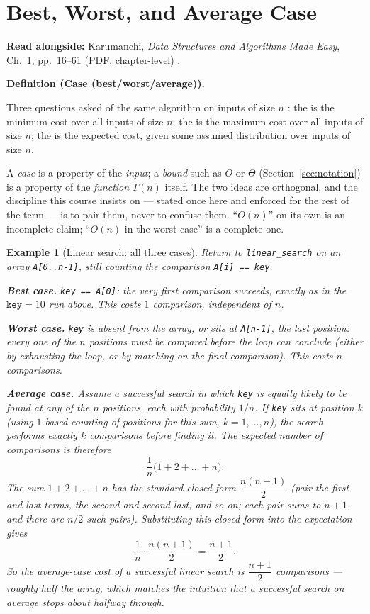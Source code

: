 \documentclass[11pt]{article}
\newtheorem{example}{Example}[section]
\newenvironment{definitionbox}[1]{%
  \par\noindent\textbf{Definition (#1).}\ \itshape
}{\par\vspace{0.3em}}
\begin{document}
\section{Best, Worst, and Average Case}
\label{sec:cases}

\textbf{Read alongside:} Karumanchi, \textit{Data Structures and Algorithms Made Easy}, Ch.~1, pp.~16--61 (PDF, chapter-level) \cite{Karumanchi2017_data_structures_algorithms_made_easy}.

\begin{definitionbox}{Case (best/worst/average)}
Three questions asked of the same algorithm on inputs of size $n$
\cite{Karumanchi2017_data_structures_algorithms_made_easy}: the
 is the minimum cost over all inputs of size $n$; the
 is the maximum cost over all inputs of size $n$; the
 is the expected cost, given some assumed distribution
over inputs of size $n$.
\end{definitionbox}

A \emph{case} is a property of the \emph{input}; a \emph{bound} such as $O$
or $\Theta$ (Section~\ref{sec:notation}) is a property of the \emph{function}
$T(n)$ itself. The two ideas are orthogonal, and the discipline this course
insists on --- stated once here and enforced for the rest of the term --- is
to pair them, never to confuse them. ``$O(n)$'' on its own is an incomplete
claim; ``$O(n)$ in the worst case'' is a complete one.

\begin{example}[Linear search: all three cases]
Return to \texttt{linear\_search} on an array \texttt{A[0..n-1]}, still
counting the comparison \texttt{A[i] == key}.

\textbf{Best case.} \texttt{key == A[0]}: the very first comparison
succeeds, exactly as in the $\texttt{key} = 10$ run above. This costs $1$
comparison, independent of $n$.

\textbf{Worst case.} \texttt{key} is absent from the array, or sits at
\texttt{A[n-1]}, the last position: every one of the $n$ positions must be
compared before the loop can conclude (either by exhausting the loop, or by
matching on the final comparison). This costs $n$ comparisons.

\textbf{Average case.} Assume a \emph{successful} search in which
\texttt{key} is equally likely to be found at any of the $n$ positions,
each with probability $1/n$. If \texttt{key} sits at position $k$ (using
$1$-based counting of positions for this sum, $k = 1, \dots, n$), the search
performs exactly $k$ comparisons before finding it. The expected number of
comparisons is therefore
\[
  \frac{1}{n}\bigl(1 + 2 + \dots + n\bigr).
\]
The sum $1 + 2 + \dots + n$ has the standard closed form $\dfrac{n(n+1)}{2}$
(pair the first and last terms, the second and second-last, and so on; each
pair sums to $n+1$, and there are $n/2$ such pairs). Substituting this closed
form into the expectation gives
\[
  \frac{1}{n} \cdot \frac{n(n+1)}{2} = \frac{n+1}{2}.
\]
So the average-case cost of a successful linear search is
$\dfrac{n+1}{2}$ comparisons --- roughly half the array, which matches the
intuition that a successful search on average stops about halfway through.
\end{example}
\end{document}
